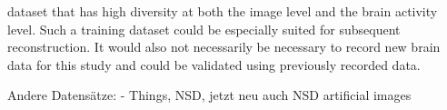 dataset that has high diversity at both the image level and the brain activity level. Such a training dataset could be especially suited for subsequent reconstruction. It would also not necessarily be necessary to record new brain data for this study and could be validated using previously recorded data.




Andere Datensätze:
- Things\cite{hebartTHINGSdataMultimodalCollection2023}, NSD\cite{allenMassive7TFMRI2022}, jetzt neu auch NSD  artificial images \cite{gifford7TFMRIDataset2025}

